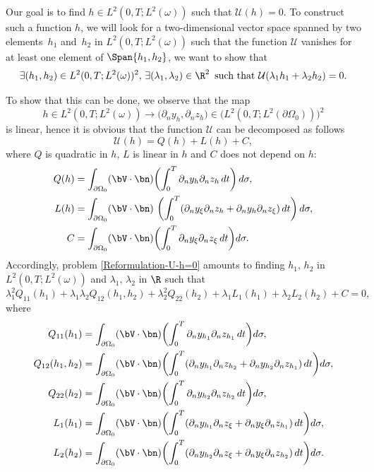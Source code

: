 Our goal is to find $h \in L^2(0,T; L^2(\omega))$ such that $\mathcal{U}(h)= 0$. To construct such a function $h$, we will look for a two-dimensional vector space spanned by two elements~$h_1$ and~$h_2$ in $L^2(0,T; L^2(\omega))$ such that the function $\mathcal{U}$ vanishes for at least one element of $\Span \{ h_1, h_2\}$, \ie we want to show that
\begin{equation}
\label{Reformulation-U-h=0}
\exists (h_1,h_2)\in L^2(0,T; L^2(\omega))^2,\,\exists (\lambda_1, \lambda_2) \in \R^2 \, \text{ such that } \mathcal{U}(\lambda_1 h_1 + \lambda_2 h_2) = 0.
\end{equation}

To show that this can be done, we observe that the map
\[
h \in L^2(0,T; L^2(\omega)) \to \bigl(\partial_n y_h, \partial_n z_h)\in (L^2(0,T; L^2(\partial\Omega_0))\bigr)^2
\]
is linear, hence it is obvious that the function $\mathcal{U}$ can be decomposed as follows
\begin{equation*}
\mathcal{U}(h)=Q(h)+L(h)+C,
\end{equation*}
where $Q$ is quadratic in $h$, $L$ is linear in $h$ and $C$ does not depend on $h$:
\begin{align}
Q(h)&= \int_{\partial \Omega_0} (\bV\cdot \bn)
\biggl(\int_0^T \partial_{n} y_{h}\partial_{n} z_{h}\, dt\biggr)\, d\sigma,
\label{quadra}
\\
L(h)&= \int_{\partial \Omega_0}(\bV\cdot \bn) \
\biggl(\int_0^T (\partial_{n} y_{\xi}\partial_{n} z_{h}+\partial_{n} y_{h}\partial_{n} z_{\xi})\, dt \biggr)\,d\sigma,
\notag
\\
C&= \int_{\partial \Omega_0} (\bV\cdot \bn)
\biggl(\int_0^T \partial_{n} y_{\xi}\partial_{n} z_{\xi}\, dt \biggr)
d\sigma.
\notag
\end{align}
Accordingly, problem \eqref{Reformulation-U-h=0} amounts to finding $h_1,\,h_2$ in $L^2(0,T; L^2(\omega))$ and $\lambda_1,\,\lambda_2$ in $\R$ such that
\begin{equation}
\label{eqM1}
\lambda_1^2Q_{11}(h_1)+\lambda_1\lambda_2 Q_{12}(h_1,h_2)+\lambda_2^2Q_{22}(h_2)
+\lambda_1 L_{1}(h_1)+\lambda_2 L_2(h_2)+C=0,
\end{equation}
where
\begin{align*}
Q_{11}(h_1)&= \int_{\partial \Omega_0} (\bV \cdot \bn)
\biggl(\int_0^T \partial_{n} y_{h_1}\partial_{n} z_{h_1}\, dt\biggr) d\sigma,
\\
Q_{12}(h_1,h_2)&= \int_{\partial \Omega_0}(\bV\cdot \bn) \biggl(\int_0^T (\partial_{n} y_{h_1}\partial_{n} z_{h_2}+\partial_{n} y_{h_2}\partial_{n} z_{h_1})\, dt\biggr) d\sigma,
\\
Q_{22}(h_2) &= \int_{\partial \Omega_0} (\bV \cdot \bn)\biggl(\int_0^T \partial_{n} y_{h_2}\partial_{n} z_{h_2}\, dt\biggr) d\sigma,
\\
L_1(h_1) &= \int_{\partial \Omega_0} (\bV \cdot \bn)\biggl(\int_0^T (\partial_{n} y_{h_1}\partial_{n} z_{\xi}+\partial_{n} y_{\xi}\partial_{n} z_{h_1})\, dt\biggr) d\sigma,
\\
L_2(h_2) &= \int_{\partial\Omega_0} (\bV \cdot \bn)\biggl(\int_0^T(\partial_{n} y_{h_2}\partial_{n} z_{\xi}+\partial_{n} y_{\xi}\partial_{n} z_{h_2})\, dt \biggr)d\sigma.
\end{align*}

